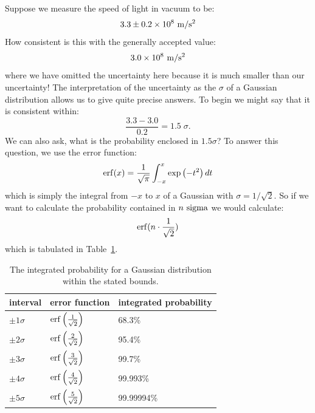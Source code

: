 \documentclass[12pt,oneside]{book}
\begin{document}
Suppose we measure the speed of light in vacuum to be:
\begin{displaymath}
3.3 \pm 0.2 \times 10^8~{\rm m}/{\rm s}^2
\end{displaymath}
How consistent is this with the generally accepted value:
\begin{displaymath}
3.0 \times 10^8~{\rm m}/{\rm s}^2
\end{displaymath}
where we have omitted the uncertainty here because it is much smaller than our uncertainty!   The interpretation of the uncertainty as the $\sigma$ of a Gaussian distribution allows us to give quite precise answers.  To begin we might say that it is consistent within:
\begin{displaymath}
\frac{3.3 - 3.0}{0.2} = 1.5 \; \sigma.
\end{displaymath}
We can also ask, what is the probability enclosed in $1.5 \sigma$?  To answer this question, we use the error function:
\begin{displaymath}
{\rm erf}(x) = \frac{1}{\sqrt{\pi}} \int^x_{-x} \exp\left(-t^2 \right) dt
\end{displaymath}
which is simply the integral from $-x$ to $x$ of a Gaussian with $\sigma = 1/\sqrt{2}$.  So if we want to calculate the probability contained in $n~\rm sigma$ we would calculate:
\begin{displaymath}
 {\rm erf}(n \cdot \frac{1}{\sqrt{2}})
\end{displaymath}
which is tabulated in Table~\ref{tbl:erf}.\\

\begin{table}[thb]
\begin{center}
\begin{tabular}{lll}
interval & error function & integrated probability \\ 
\hline
$\pm1 \sigma$ & ${\rm erf}\left( \frac{1}{\sqrt{2}} \right)$ & 68.3\% \\
$\pm2 \sigma$ & ${\rm erf}\left( \frac{2}{\sqrt{2}} \right)$ & 95.4\% \\
$\pm3 \sigma$ & ${\rm erf}\left( \frac{3}{\sqrt{2}} \right)$ & 99.7\% \\
$\pm4 \sigma$ & ${\rm erf}\left( \frac{4}{\sqrt{2}} \right)$ & 99.993\% \\
$\pm5 \sigma$ & ${\rm erf}\left( \frac{5}{\sqrt{2}} \right)$ & 99.99994\% \\ 
\end{tabular}
\caption{\label{tbl:erf} The integrated probability for a Gaussian distribution within the stated bounds.} 
\end{center}
\end{table}
\end{document}
